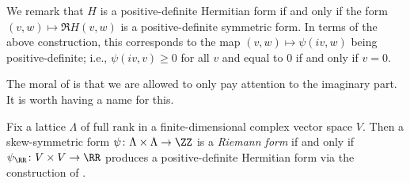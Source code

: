 \documentclass[../notes.tex]{subfiles}
\begin{document}
\begin{remark} \label{rem:im-of-hermitian-pos-def}
	We remark that $H$ is a positive-definite Hermitian form if and only if the form $(v,w)\mapsto\Re H(v,w)$ is a positive-definite symmetric form. In terms of the above construction, this corresponds to the map $(v,w)\mapsto\psi(iv,w)$ being positive-definite; i.e., $\psi(iv,v)\ge0$ for all $v$ and equal to $0$ if and only if $v=0$.
\end{remark}
The moral of  is that we are allowed to only pay attention to the imaginary part. It is worth having a name for this.
\begin{definition}
	Fix a lattice $\Lambda$ of full rank in a finite-dimensional complex vector space $V$. Then a skew-symmetric form $\psi\colon\Lambda\times\Lambda\to\ZZ$ is a \textit{Riemann form} if and only if $\psi_\RR\colon V\times V\to\RR$ produces a positive-definite Hermitian form via the construction of .
\end{definition}
\end{document}

